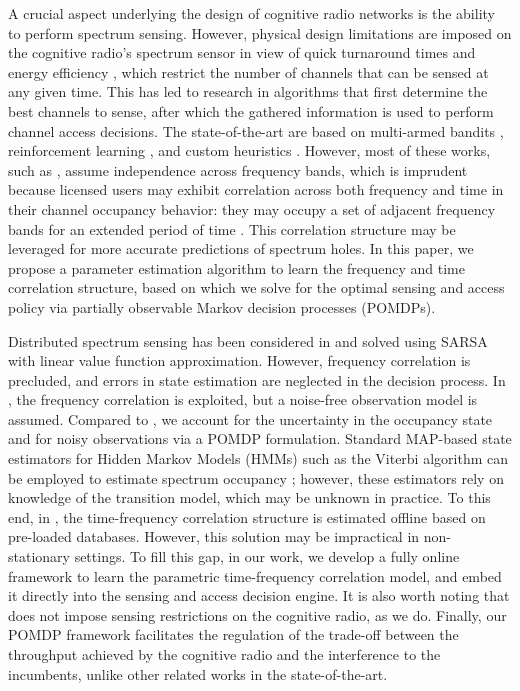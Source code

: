 \documentclass[10pt,twocolumn]{IEEEtran}
\begin{document}
A crucial aspect underlying the design of cognitive radio networks is the ability to perform spectrum sensing. However, physical design limitations are imposed on the cognitive radio's spectrum sensor in view of quick turnaround times and energy efficiency \cite{5990482}, which restrict the number of channels that can be sensed at any given time. This has led to research in algorithms that first determine the best channels to sense, after which the gathered information is used to perform channel access decisions. The state-of-the-art are based on multi-armed bandits \cite{7094730}, reinforcement learning \cite{6507570}, and custom heuristics \cite{4554696, 6956794}. However, most of these works, such as \cite{7094730, 6507570, 7895211, 7336513, 8571293}, assume independence across frequency bands, which is imprudent because licensed users may exhibit correlation across both frequency and time in their channel occupancy behavior: they may occupy a set of adjacent frequency bands for an extended period of time \cite{6188346}. This correlation structure may be leveraged for more accurate predictions of spectrum holes. In this paper, we propose a parameter estimation algorithm to learn the frequency and time correlation structure, based on which we solve for the optimal sensing and access policy via partially observable Markov decision processes (POMDPs).

Distributed spectrum sensing has been considered in \cite{6507570} and solved using SARSA with linear value function approximation. However, frequency correlation is precluded, and errors in state estimation are neglected in the decision process. In \cite{6956794}, the frequency correlation is exploited, but a noise-free observation model is assumed. Compared to \cite{6507570, 6956794}, we account for the uncertainty in the occupancy state and for noisy observations via a POMDP formulation. Standard MAP-based state estimators for Hidden Markov Models (HMMs) such as the Viterbi algorithm can be employed to estimate spectrum occupancy \cite{4554696}; however, these estimators rely on knowledge of the transition model, which may be unknown in practice. To this end, in \cite{6956794, 4554696}, the time-frequency correlation structure is estimated offline based on pre-loaded databases. However, this solution may be impractical in non-stationary settings. To fill this gap, in our work, we develop a fully online framework  to learn the parametric time-frequency correlation model, and embed it directly into the sensing and access decision engine. It is also worth noting that \cite{4554696} does not impose sensing restrictions on the cognitive radio, as we do. Finally, our POMDP framework facilitates the regulation of the trade-off between the throughput achieved by the cognitive radio and the interference to the incumbents, unlike other related works in the state-of-the-art.
\end{document}
